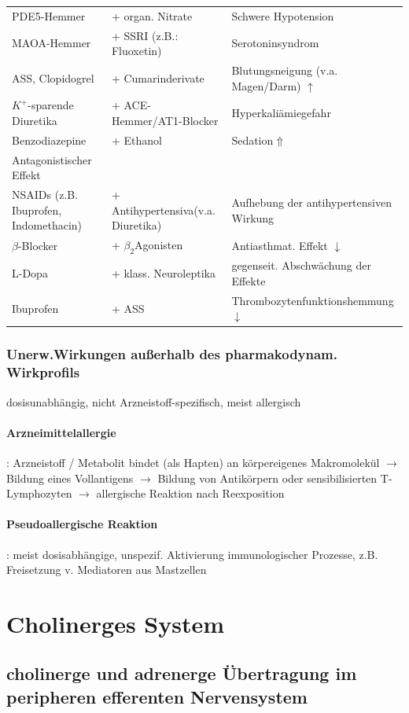 \documentclass[10pt,a4paper]{report}
\begin{document}
\begin{tabularx}{\textwidth}{XXX}
PDE5-Hemmer&+ organ. Nitrate&Schwere Hypotension\\
MAOA-Hemmer&+ SSRI (z.B.: Fluoxetin)&Serotoninsyndrom\\
ASS, Clopidogrel&+ Cumarinderivate&Blutungsneigung (v.a. Magen/Darm) $\uparrow$\\
$K^+$-sparende Diuretika&+ ACE-Hemmer/AT1-Blocker&Hyperkaliämiegefahr\\
Benzodiazepine&+ Ethanol&Sedation$\Uparrow$\\
Antagonistischer Effekt&&\\
NSAIDs (z.B. Ibuprofen, Indomethacin)&+ Antihypertensiva(v.a. Diuretika)&Aufhebung der antihypertensiven Wirkung\\
$\beta$-Blocker&+ $\beta_2$Agonisten&Antiasthmat. Effekt $\downarrow$\\
L-Dopa&+ klass. Neuroleptika&gegenseit. Abschwächung der Effekte\\
Ibuprofen&+ ASS&Thrombozytenfunktionshemmung $\downarrow$\\
\end{tabularx}
\subsection{Unerw.Wirkungen außerhalb des pharmakodynam. Wirkprofils}
dosisunabhängig, nicht Arzneistoff-spezifisch, meist allergisch\\
\subsubsection{Arzneimittelallergie}: Arzneistoff / Metabolit bindet (als Hapten) an körpereigenes Makromolekül $\rightarrow$ Bildung eines Vollantigens $\rightarrow$ Bildung von Antikörpern oder sensibilisierten T-Lymphozyten $\rightarrow$ allergische Reaktion nach Reexposition
\subsubsection{Pseudoallergische Reaktion}: meist dosisabhängige, unspezif. Aktivierung immunologischer Prozesse, z.B. Freisetzung v. Mediatoren aus Mastzellen 
\chapter{Cholinerges System}
\section{cholinerge und adrenerge Übertragung im peripheren efferenten Nervensystem}
\end{document}
